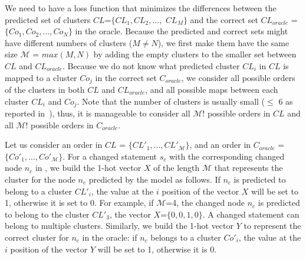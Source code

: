 

We need to have a loss function that minimizes the differences between
the predicted set of clusters $CL$=$\{CL_1,CL_2, ...,$ $CL_M\}$ and
the correct set $CL_{oracle}$ = $\{Co_{1}, Co_{2},..., Co_{N}\}$ in
the oracle. Because the predicted and correct sets might have
different numbers of clusters ($M \neq N$), we first make them have
the same size $\mathcal{M}$ = $max(M,N)$ by adding the empty clusters
to the smaller set between $CL$ and $CL_{oracle}$.
%
Because we do not know what predicted cluster $CL_i$ in $CL$ is mapped
to a cluster $Co_j$ in the correct set $C_{oracle}$, we consider all
possible orders of the clusters in both $CL$ and $CL_{oracle}$, and
all possible maps between each cluster $CL_i$ and $Co_j$. Note that
the number of clusters is usually small ($\leq$ 6 as reported
in~\cite{nguyen-issre13}), thus, it is manageable to consider all
$\mathcal{M}!$ possible orders in $CL$ and all $\mathcal{M}!$ possible
orders in $C_{oracle}$.

Let us consider an order in $CL$ = $\{CL'_1,..., CL'_{\mathcal{M}}\}$,
and an order in $C_{oracle}$ = $\{Co'_{1},..., Co'_{\mathcal{M}}\}$.
For a changed statement $s_c$ with the corresponding changed node
$n_c$ in {\mvpdg}, we build the 1-hot vector $X$ of the length
$\mathcal{M}$ that represents the cluster for the node $n_c$
predicted by the model as follows. If $n_c$ is predicted to belong to
a cluster $CL'_{i}$, the value at the $i$ position of the vector $X$
will be set to 1, otherwise it is set to 0. For example, if
$\mathcal{M}$=4, the changed node $n_c$ is predicted to belong to the
cluster $CL'_3$, the vector $X$=$\{0,0,1,0\}$. A changed statement can
belong to multiple clusters. Similarly, we build the 1-hot vector $Y$
to represent the correct cluster for $n_c$ in the oracle: if $n_c$
belongs to a cluster $Co'_{i}$, the value at the $i$ position of the
vector $Y$ will be set to 1, otherwise it is 0.

